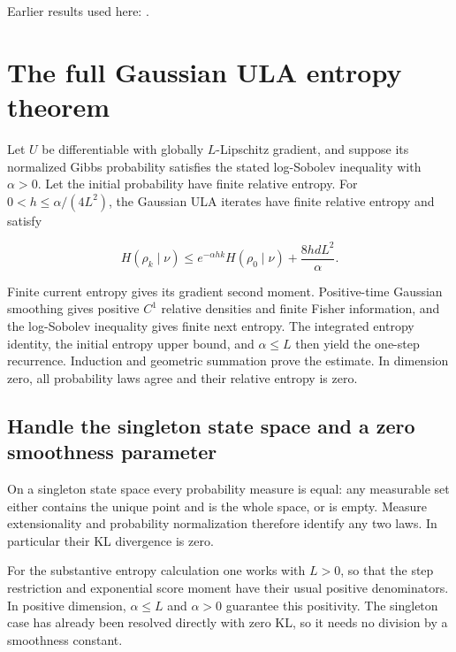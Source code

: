 \documentclass[11pt,a4paper]{report}
\begin{document}
Earlier results used here: \cite[Section~3.26.3]{LangevinLean2026ULASC}.
\section{\texorpdfstring{The full Gaussian ULA entropy theorem}{The full Gaussian ULA entropy theorem}}
\label{proof-module-UnadjustedLangevin-LSI-UnconditionalTheorem-lean}


Let \(U\) be differentiable with globally \(L\)-Lipschitz gradient, and suppose its normalized Gibbs probability satisfies the stated log-Sobolev inequality with \(\alpha>0\). Let the initial probability have finite relative entropy. For \(0<h\le\alpha/(4L^2)\), the Gaussian ULA iterates have finite relative entropy and satisfy

\[H(\rho_k\mid\nu)\le e^{-\alpha hk}H(\rho_0\mid\nu)+\frac{8hdL^2}{\alpha}.\]

Finite current entropy gives its gradient second moment. Positive-time Gaussian smoothing gives positive \(C^1\) relative densities and finite Fisher information, and the log-Sobolev inequality gives finite next entropy. The integrated entropy identity, the initial entropy upper bound, and \(\alpha\le L\) then yield the one-step recurrence. Induction and geometric summation prove the estimate. In dimension zero, all probability laws agree and their relative entropy is zero.

\subsection{\texorpdfstring{Handle the singleton state space and a zero smoothness parameter}{Handle the singleton state space and a zero smoothness parameter}}
\label{report-step-UnadjustedLangevin-LSI-UnconditionalTheorem-lean-1}


On a singleton state space every probability measure is equal: any measurable set either contains the unique point and is the whole space, or is empty. Measure extensionality and probability normalization therefore identify any two laws. In particular their KL divergence is zero.



For the substantive entropy calculation one works with \(L>0\), so that the step restriction and exponential score moment have their usual positive denominators. In positive dimension, \(\alpha\le L\) and \(\alpha>0\) guarantee this positivity. The singleton case has already been resolved directly with zero KL, so it needs no division by a smoothness constant.
\end{document}

